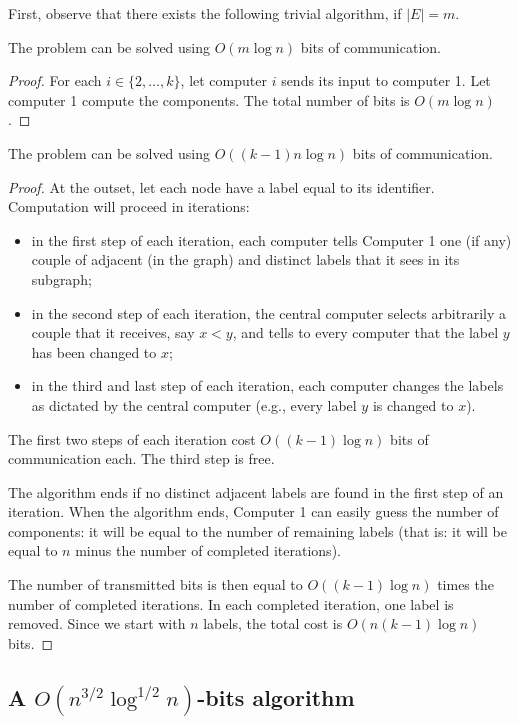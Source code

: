 First, observe that there exists the following trivial algorithm, if $|E| = m$.
\begin{thm}
The problem can be solved using $O(m \log n)$  bits of communication.
\end{thm}
\begin{proof}
For each $i \in \{2,\ldots, k\}$, let computer $i$ sends its input to computer 1. Let computer 1 compute the   components. The total number of bits is $O(m \log n)$.
\end{proof}
\begin{thm}
The problem can be solved using $O((k-1)n \log n)$ bits of communication.
\end{thm}
\begin{proof}
At the outset, let each node have a label equal to its identifier. Computation will proceed in iterations:\begin{itemize}
\item in the first step of each iteration, each computer tells Computer 1 one (if any) couple of adjacent (in the graph) and distinct labels that it sees in its subgraph;
\item in the second step of each iteration, the central computer selects
arbitrarily a couple that it receives, say $x<y$, and tells to every
computer that the label $y$ has been changed to $x$;
\item in the third and last step of each iteration, each computer changes the labels
as dictated by the central computer (e.g., every label $y$ is changed to
$x$).
\end{itemize}
The first two steps of each iteration cost $O((k-1) \log n)$ bits of communication each. The third step is free.


 
The algorithm ends if no distinct adjacent labels are found in the
first step of an iteration. When the algorithm ends, Computer 1 can easily guess the number of components: it will be equal
to the number of remaining labels (that is: it will be equal to $n$
minus the number of completed iterations).

The number of transmitted bits  is then equal to $O((k-1) \log n)$ times the number of
completed iterations. In each completed iteration, one label is
removed. Since we start with $n$ labels, the total
cost is $O(n (k-1) \log n)$ bits.
\end{proof}

\subsection{A $O\left(n^{3/2} \log^{1/2} n\right)$-bits algorithm}

